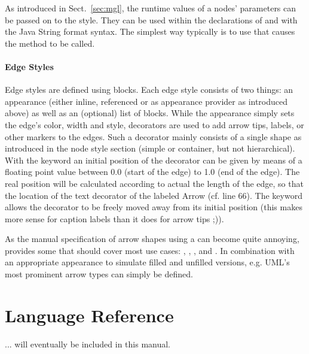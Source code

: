 \documentclass[a4paper,american,12pt]{scrreprt}
\begin{document}
As introduced in Sect.~\ref{sec:mgl}, the runtime values of a nodes' parameters
can be passed on to the style. They can be used within the 
declarations of  and  with the Java String format
syntax\footnotemark{}. The simplest way typically is to use  that
causes the  method to be called.
%
%


\subsubsection{Edge Styles}

Edge styles are defined using   blocks. Each edge
style consists of two things: an appearance (either inline, referenced or as
appearance provider as introduced above) as well as an (optional) list of 
 blocks. While the appearance simply sets the edge's color, width
and style, decorators are used to add arrow tips, labels, or other markers to
the edges. Such a decorator mainly consists of a single shape as introduced in
the node style section (simple or container, but not hierarchical). With the
keyword  an initial position of the decorator can be given by means
of a floating point value between 0.0 (start of the edge) to 1.0 (end of the
edge). The real position will be calculated according to actual the length of
the edge, so that the location of the text decorator of the labeled Arrow (cf.
line 66). The keyword  allows the decorator to be freely moved away
from its initial position (this makes more sense for caption labels than it does
for arrow tips ;)). 

As the manual specification of arrow shapes using a  can become
quite annoying, \cinco{} provides some  that
should cover most use cases: , , , and
. In combination with an appropriate appearance to simulate filled
and unfilled versions, e.g. UML's most prominent arrow types can simply be
defined.


\chapter{Language Reference}

... will eventually be included in this manual.
\end{document}
